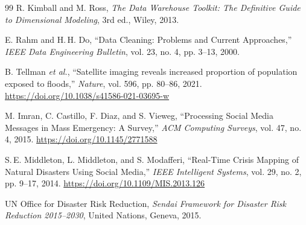 \documentclass[11pt,a4paper]{article}
\begin{document}
\begin{thebibliography}{99}
R. Kimball and M. Ross, \emph{The Data Warehouse Toolkit: The Definitive
Guide to Dimensional Modeling}, 3rd ed., Wiley, 2013.

E. Rahm and H.\,H. Do, ``Data Cleaning: Problems and Current Approaches,''
\emph{IEEE Data Engineering Bulletin}, vol. 23, no. 4, pp. 3--13, 2000.

B. Tellman \emph{et al.}, ``Satellite imaging reveals increased proportion
of population exposed to floods,'' \emph{Nature}, vol. 596, pp. 80--86,
2021. \url{https://doi.org/10.1038/s41586-021-03695-w}

M. Imran, C. Castillo, F. Diaz, and S. Vieweg, ``Processing Social Media
Messages in Mass Emergency: A Survey,'' \emph{ACM Computing Surveys},
vol. 47, no. 4, 2015. \url{https://doi.org/10.1145/2771588}

S.\,E. Middleton, L. Middleton, and S. Modafferi, ``Real-Time Crisis
Mapping of Natural Disasters Using Social Media,'' \emph{IEEE Intelligent
Systems}, vol. 29, no. 2, pp. 9--17, 2014.
\url{https://doi.org/10.1109/MIS.2013.126}

UN Office for Disaster Risk Reduction, \emph{Sendai Framework for Disaster
Risk Reduction 2015--2030}, United Nations, Geneva, 2015.

\end{thebibliography}
\end{document}
